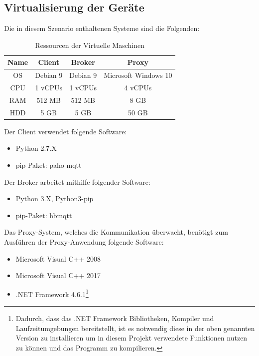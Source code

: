     \subsection{Virtualisierung der Geräte}
    Die in diesem Szenario enthaltenen Systeme sind die Folgenden:
    \begin{table}[h]
        \centering
        \begin{tabular}{c|c|c|c}
            Name & Client & Broker & Proxy \\ \hline
            OS & Debian 9 & Debian 9 & Microsoft Windows 10 \\
            CPU & 1 vCPUs & 1 vCPUs & 4 vCPUs \\
            RAM & 512 \ac{MB} & 512 \ac{MB} & 8 GB \\
            HDD & 5 GB & 5 GB & 50 GB \\
        \end{tabular}
        \caption{Ressourcen der Virtuelle Maschinen}
        \label{tab:ressourcenverteilung}
    \end{table}
    
    Der Client verwendet folgende Software:
    \begin{itemize}
        \item Python 2.7.X
        \item pip-Paket: paho-mqtt
    \end{itemize}
            
    Der Broker arbeitet mithilfe folgender Software:
    \begin{itemize}
        \item Python 3.X, Python3-pip
        \item pip-Paket: hbmqtt
    \end{itemize}
            
    Das Proxy-System, welches die Kommunikation überwacht, benötigt zum Ausführen der Proxy-Anwendung folgende Software:
    \begin{itemize}
        \item Microsoft Visual C++ 2008
        \item Microsoft Visual C++ 2017
        \item .NET Framework 4.6.1\footnote{Dadurch, dass das .NET Framework Bibliotheken, Kompiler und Laufzeitumgebungen bereitstellt, ist es notwendig diese in der oben genannten Version zu installieren um in diesem Projekt verwendete Funktionen nutzen zu können und das Programm zu kompilieren.}
    \end{itemize}
    
